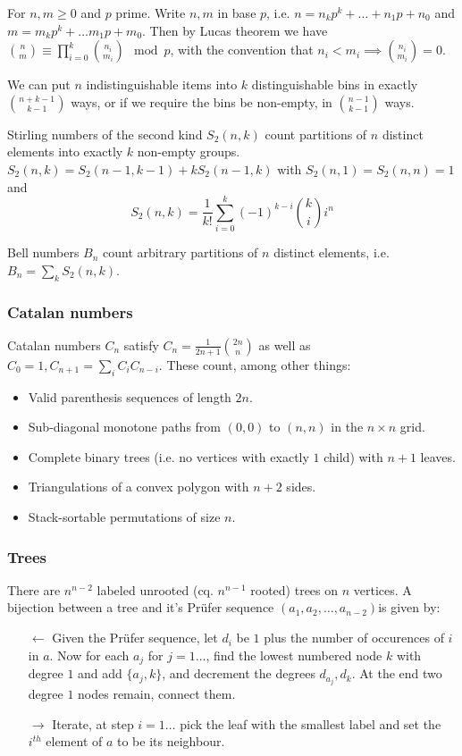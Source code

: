 \documentclass[
	a4paper,
	landscape,
	10pt,
	article
]{article}
\begin{document}
For $n, m \geq 0$ and $p$ prime. Write $n, m$ in base $p$, i.e.
$n = n_k p^k + \dots + n_1 p + n_0$ and $m = m_k p^k + \dots m_1 p + m_0$. Then
by Lucas theorem we have $\binom{n}{m} \equiv \prod_{i=0}^k \binom{n_i}{m_i}
	\mod p$, with the convention that $n_i < m_i \implies \binom{n_i}{m_i} =0$.



We can put $n$ indistinguishable items into $k$ distinguishable bins in exactly
$\binom{n+k-1}{k-1}$ ways, or if we require the bins be non-empty, in
$\binom{n-1}{k-1}$ ways.

Stirling numbers of the second kind $S_2(n, k)$ count partitions of $n$
distinct elements into exactly $k$ non-empty groups.
$S_2(n, k) = S_2(n-1, k-1) + kS_2(n-1, k)$ with $S_2(n, 1) = S_2(n, n) = 1$ and
$$S_2(n, k) = \frac{1}{k!}\sum_{i=0}^k (-1)^{k-i}\binom{k}{i}i^n$$

Bell numbers $B_n$ count arbitrary partitions of $n$ distinct elements, i.e.
$B_n = \sum_k S_2(n, k)$.

\subsubsection*{Catalan numbers}
Catalan numbers $C_n$ satisfy $C_n = \frac{1}{2n+1}\binom{2n}{n}$ as well
as $C_0 = 1, C_{n+1} = \sum_i C_i C_{n-i}$. These count, among other things:
\begin{itemize}
	\item Valid parenthesis sequences of length $2n$.
	\item Sub-diagonal monotone paths from $(0, 0)$ to $(n, n)$ in the
		$n\times n$ grid.
	\item Complete binary trees (i.e. no vertices with exactly $1$ child)
		with $n+1$ leaves.
	\item Triangulations of a convex polygon with $n+2$ sides.
	\item Stack-sortable permutations of size $n$.
\end{itemize}

\subsubsection*{Trees}
There are $n^{n-2}$ labeled unrooted (cq. $n^{n-1}$ rooted) trees on $n$
vertices. A bijection between a tree and it's Pr\"ufer sequence
$(a_1, a_2, \dots, a_{n-2})$is given by:
\begin{enumerate}
	\item[$\leftarrow$] Given the Pr\"ufer sequence, let $d_i$ be $1$ plus the
		number of occurences of $i$ in $a$. Now for each $a_j$ for $j=1\dots$,
		find the lowest
		numbered node $k$ with degree $1$ and add $\{a_j, k\}$, and decrement
		the degrees $d_{a_j}, d_k$. At the end two degree $1$ nodes remain,
		connect them.
	\item[$\rightarrow$] Iterate, at step $i=1\dots$ pick the leaf with the
		smallest label and set the $i^{th}$ element of $a$ to be its
		neighbour.
\end{enumerate}
\end{document}
